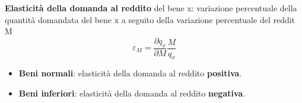 \documentclass[../main.tex]{subfiles}
\begin{document}
\textbf{Elasticità della domanda al reddito} del bene x: variazione percentuale della quantità domandata del bene x a seguito della variazione percentuale del reddit M
$$\varepsilon_M=\frac{\partial q_x}{\partial M} \frac{M}{q_x}$$

\begin{itemize}
	\item \textbf{Beni normali}: elasticità della domanda al reddito \textbf{positiva}.
	\item \textbf{Beni inferiori}: elasticità della domanda al reddito \textbf{negativa}.
\end{itemize}
\end{document}
